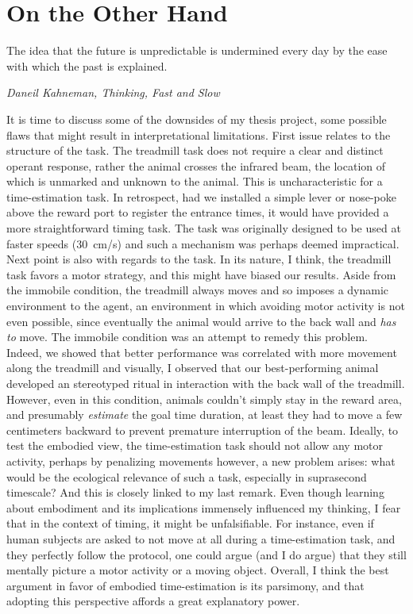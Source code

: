 \section{On the Other Hand}
\epigraph{The idea that the future is unpredictable is undermined every day by the ease with which the past is explained.}
{\textit{Daneil Kahneman, Thinking, Fast and Slow}}
\noindent
It is time to discuss some of the downsides of my thesis project, some possible flaws that might result in interpretational limitations.
First issue relates to the structure of the task.
The treadmill task does not require a clear and distinct operant response, rather the animal crosses the infrared beam, the location of which is unmarked and unknown to the animal.
This is uncharacteristic for a time-estimation task.
In retrospect, had we installed a simple lever or nose-poke above the reward port to register the entrance times, it would have provided a more straightforward timing task.
The task was originally designed to be used at faster speeds (30~cm/s) and such a mechanism was perhaps deemed impractical.
Next point is also with regards to the task.
In its nature, I think, the treadmill task favors a motor strategy, and this might have biased our results.
Aside from the immobile condition, the treadmill always moves and so imposes a dynamic environment to the agent, an environment in which avoiding motor activity is not even possible, since eventually the animal would arrive to the back wall and \textit{has to} move.
The immobile condition was an attempt to remedy this problem.
Indeed, we showed that better performance was correlated with more movement along the treadmill and visually, I observed that our best-performing animal developed an stereotyped ritual in interaction with the back wall of the treadmill.
However, even in this condition, animals couldn't simply stay in the reward area, and presumably \textit{estimate} the goal time duration, at least they had to move a few centimeters backward to prevent premature interruption of the beam.
Ideally, to test the embodied view, the time-estimation task should not allow any motor activity, perhaps by penalizing movements however, a new problem arises:
what would be the ecological relevance of such a task, especially in suprasecond timescale?
And this is closely linked to my last remark.
Even though learning about embodiment and its implications immensely influenced my thinking, I fear that in the context of timing, it might be unfalsifiable.
For instance, even if human subjects are asked to not move at all during a time-estimation task, and they perfectly follow the protocol, one could argue (and I do argue) that they still mentally picture a motor activity or a moving object.
Overall, I think the best argument in favor of embodied time-estimation is its parsimony, and that adopting this perspective affords a great explanatory power.



